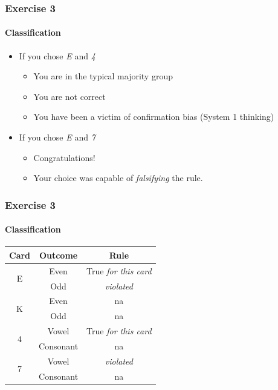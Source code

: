\documentclass[table]{beamer}
\begin{document}
  \begin{frame}
    \frametitle{Exercise 3}
    \framesubtitle{Classification}
    \begin{itemize}
      \item<1-> If you chose \emph{E} and \emph{4}
      \begin{itemize}
        \item<2-> You are in the typical majority group
        \item<3-> You are not correct
        \item<4-> You have been a victim of confirmation bias (System 1 thinking)
      \end{itemize}
      \item<5-> If you chose \emph{E} and \emph{7}
      \begin{itemize}
        \item<6-> Congratulations!
        \item<6-> Your choice was capable of \textit{falsifying} the rule.
      \end{itemize}
    \end{itemize}
  \end{frame}

  \begin{frame}
    \frametitle{Exercise 3}
    \framesubtitle{Classification}
    \begin{center}
	\begin{tabular}{c|c|c}
	  Card & Outcome & Rule \\
	  \hline
	  \hline
	    \multirow{2}{*}{E} & Even & True \emph{for this card} \\
	                                & Odd & \emph{violated} \\
	  \hline
	    \multirow{2}{*}{K} & Even & na \\
	                                & Odd & na \\	    
	  \hline
	    \multirow{2}{*}{4} & Vowel & True \emph{for this card} \\
	                                & Consonant & na \\
	  \hline
	    \multirow{2}{*}{7} & Vowel & \emph{violated} \\
	                                & Consonant & na \\	    
	\end{tabular}
    \end{center}
  \end{frame}
\end{document}
